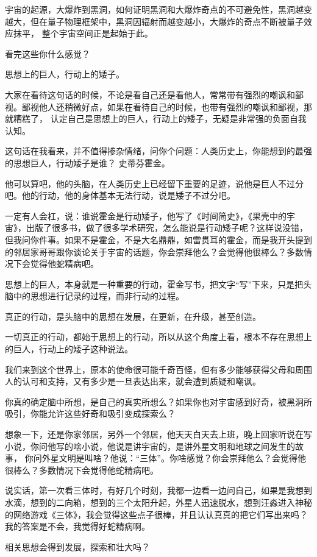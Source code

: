 宇宙的起源，大爆炸到黑洞，如何证明黑洞和大爆炸奇点的不可避免性，黑洞越变越大，但在量子物理框架中，黑洞因辐射而越变越小，大爆炸的奇点不断被量子效应抹平，
整个宇宙空间正是起始于此。

看完这些你什么感觉？

思想上的巨人，行动上的矮子。

大家在看待这句话的时候，不论是看自己还是看他人，常常带有强烈的嘲讽和鄙视。鄙视他人还稍微好点，如果在看待自己的时候，也带有强烈的嘲讽和鄙视，那就糟糕了，
认定自己是思想上的巨人，行动上的矮子，无疑是非常强的负面自我认知。

这句话在我看来，并不值得掺杂情绪，问你个问题：人类历史上，你能想到的最强的思想巨人，行动矮子是谁？  史蒂芬霍金。

他可以算吧，他的头脑，在人类历史上已经留下重要的足迹，说他是巨人不过分吧。他的行动，他的身体基本无法行动，说是矮子不过分吧。

一定有人会杠，说：谁说霍金是行动矮子，他写了《时间简史》，《果壳中的宇宙》，出版了很多书，做了很多学术研究，怎么能说是行动矮子呢？这样说没错，但我问你件事。如果不是霍金，不是大名鼎鼎，如雷贯耳的霍金，而是我开头提到的邻居家哥哥跟你谈论关于宇宙的话题，你会崇拜他么？会觉得他很棒么？多数情况下会觉得他蛇精病吧。

思想上的巨人，本身就是一种重要的行动，霍金写书，把文字“写”下来，只是把头脑中的思想进行记录的过程，而非行动的过程。

真正的行动，是头脑中的思想在发展，在更新，在升级，甚至创造。

一切真正的行动，都始于思想上的行动，所以从这个角度上看，根本不存在思想上的巨人，行动上的矮子这种说法。

我们来到这个世界上，原本的使命很可能千奇百怪，但有多少能够获得父母和周围人的认可和支持，又有多少是一旦表达出来，就会遭到质疑和嘲讽。

你真的确定脑中所想，是自己的真实所想么？如果你也对宇宙感到好奇，被黑洞所吸引，你能允许这些好奇和吸引变成探索么？

想象一下，还是你家邻居，另外一个邻居，他天天白天去上班，晚上回家听说在写小说，你问他写的啥小说，他说是讲宇宙的，是讲外星文明和地球之间发生的故事，
你问外星文明是叫啥？他说：“三体”。你啥感觉？你会崇拜他么？会觉得他很棒么？多数情况下会觉得他蛇精病吧。

说实话，第一次看三体时，有好几个时刻，我都一边看一边问自己，如果是我想到水滴，想到的二向箱，想到的三个太阳升起，外星人迅速脱水，想到汪淼进入神秘的网络游戏《三体》，我会觉得这些点子很棒，并且认认真真的把它们写出来吗？我的答案是不会，我觉得好蛇精病啊。

相关思想会得到发展，探索和壮大吗？

